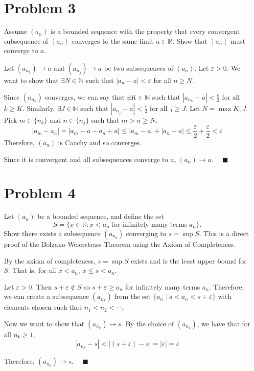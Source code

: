 \documentclass[12pt]{article}
\newcommand{\N}{\mathbb{N}}
\newcommand{\qed}{\quad \blacksquare}
\newcommand{\abs}[1]{\left\vert #1 \right\vert}
\newcommand{\ep}{\varepsilon}
\begin{document}
\pagebreak

\section{Problem 3 }
Assume $(a_n)$ is a bounded sequence with the property that every convergent subsequence of $(a_n)$ converges to the same limit $a\in\mathbb{R}$. Show that $(a_n)$ must converge to $a$.

    \color{blue}
        Let $(a_{n_k}) \to a$ and $(a_{n_j}) \to a$ be two subsequences of $(a_n)$. Let $\ep > 0$. We want to show that $\exists N \in \N$ such that $\abs{a_n - a} < \ep$ for all $n \geq N$.

        Since $(a_{n_k})$ converges, we can say that $\exists K \in \N$ such that $\abs{a_{n_k} - a} < \frac{\ep}{2}$ for all $k \geq K$. Similarly, $\exists J \in \N$ such that $\abs{a_{n_j} - a} < \frac{\ep}{2}$ for all $j \geq J$. Let $N = \max{K, J}$. Pick $m \in \{n_k\}$ and $n \in \{n_j\}$ such that $m > n \geq N$.
        \[\abs{a_m - a_n} = \abs{a_m - a - a_n + a} \leq \abs{a_m - a} + \abs{a_n - a} \leq \frac{\ep}{2} + \frac{\ep}{2} < \ep\]
        Therefore, $(a_n)$ is Cauchy and so converges. 
        
        Since it is convergent and all subsequences converge to $a$, $(a_n) \to a$. $\qed$
    \color{black}

\pagebreak

\section{Problem 4}
Let $(a_n)$ be a bounded sequence, and define the set
\begin{equation*}
	S=\{x\in\mathbb{R}: x<a_n \text{ for infinitely many terms }a_n \}.
\end{equation*}
Show there exists a subsequence $(a_{n_k})$ converging to $s=\sup S$. This is a direct proof of the Bolzano-Weierstrass Theorem using the Axiom of Completeness.

    \color{blue}
        By the axiom of completeness, $s= \sup S$ exists and is the least upper bound for $S$. That is, for all $x < a_n$, $x \leq s < a_n$. 
        
        Let $\ep > 0$. Then $s + \ep \notin S$ so $s + \ep \geq a_n$ for infinitely many terms $a_n$. Therefore, we can create a subsequence $(a_{n_k})$ from the set $\{a_n \; | \; s < a_n < s + \ep\}$ with elements chosen such that $n_1 < n_2 < \cdots$.

        Now we want to show that $(a_{n_k}) \to s$. By the choice of $(a_{n_k})$, we have that for all $n_k \geq 1$,
        \[\abs{a_{n_k} - s} < \abs{(s + \ep) - s} = \abs{\ep} = \ep\]

        Therefore, $(a_{n_k}) \to s$. $\qed$
    \color{black}
\end{document}
